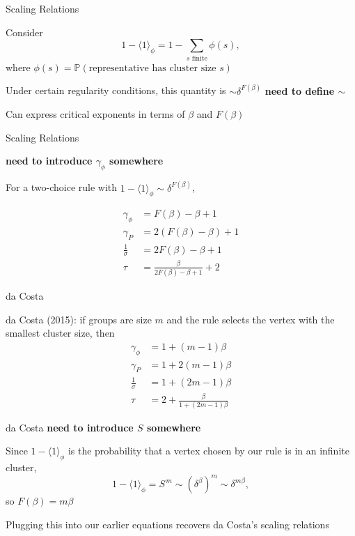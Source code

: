 \documentclass{beamer}
\newcommand{\ang}[1]{\langle #1 \rangle}
\newcommand{\warn}[1]{\textbf{\color{red}#1}}
\newcommand{\nl}{
\vspace{5mm}

}
\begin{document}
\begin{frame}{Scaling Relations}
	
	Consider
	\[
	1 - \ang{1}_{\phi} = 1 - \sum_{s \text{ finite}} \phi(s),
	\] where $\phi(s) = \mathbb{P}( \text{representative has cluster size } s )$ \nl

	Under certain regularity conditions, this quantity is $\sim \delta^{F(\beta)}$ \warn{need to define $\sim$} \nl

	\pause
	Can express critical exponents in terms of $\beta$ and $F(\beta)$
\end{frame}

\begin{frame}{Scaling Relations}

	\warn{need to introduce $\gamma_{\phi}$ somewhere}

	For a two-choice rule with $1 - \ang{1}_{\phi} \sim \delta^{F(\beta)}$,

	\begin{align*}
		\gamma_{\phi} &= F(\beta) - \beta + 1 \\
		\gamma_{P} &= 2 (F(\beta) - \beta) + 1 \\
		\frac{1}{\sigma} &= 2 F(\beta) - \beta + 1 \\
		\tau &= \frac{\beta}{2 F(\beta) - \beta + 1} +2
	\end{align*}
	
\end{frame}

\begin{frame}{da Costa}
	
	da Costa (2015): if groups are size $m$ and the rule selects the vertex with the smallest cluster size, then
	\begin{align*}
		\gamma_{\phi} &= 1 + (m-1)\beta \\
		\gamma_{P} &= 1 + 2(m-1)\beta \\
		\frac{1}{\sigma} &= 1 + (2m-1)\beta \\
		\tau &= 2 + \frac{\beta}{1 + (2m-1)\beta} 
	\end{align*}
\end{frame}

\begin{frame}{da Costa}
	\warn{need to introduce $S$ somewhere}

	Since $1 - \ang{1}_{\phi}$ is the probability that a vertex chosen by our rule is in an infinite cluster,
	\[
	1 - \ang{1}_{\phi} = S^{\,m} \sim (\delta^{\beta})^{m} \sim \delta^{m \beta},
	\] 
	so $F(\beta) = m\beta$ \nl

	Plugging this into our earlier equations recovers da Costa's scaling relations
\end{frame}
\end{document}
